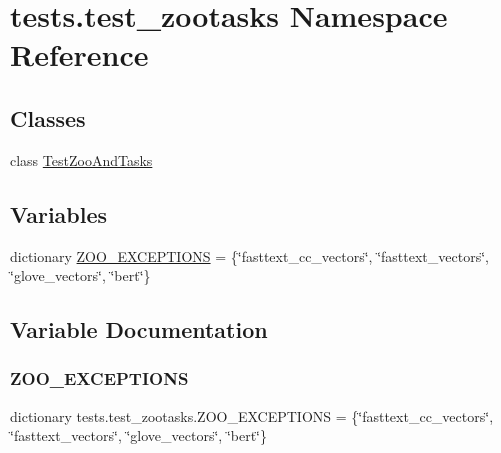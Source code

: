 \hypertarget{namespacetests_1_1test__zootasks}{}\section{tests.\+test\+\_\+zootasks Namespace Reference}
\label{namespacetests_1_1test__zootasks}
\subsection*{Classes}
\begin{DoxyCompactItemize}
\item 
class \hyperlink{classtests_1_1test__zootasks_1_1TestZooAndTasks}{Test\+Zoo\+And\+Tasks}
\end{DoxyCompactItemize}
\subsection*{Variables}
\begin{DoxyCompactItemize}
\item 
dictionary \hyperlink{namespacetests_1_1test__zootasks_a4178d1014bc80c2a09c583572fa539ed}{Z\+O\+O\+\_\+\+E\+X\+C\+E\+P\+T\+I\+O\+NS} = \{\char`\"{}fasttext\+\_\+cc\+\_\+vectors\char`\"{}, \char`\"{}fasttext\+\_\+vectors\char`\"{}, \char`\"{}glove\+\_\+vectors\char`\"{}, \char`\"{}bert\char`\"{}\}
\end{DoxyCompactItemize}


\subsection{Variable Documentation}
\mbox{\label{namespacetests_1_1test__zootasks_a4178d1014bc80c2a09c583572fa539ed}} 
\subsubsection{\texorpdfstring{Z\+O\+O\+\_\+\+E\+X\+C\+E\+P\+T\+I\+O\+NS}{ZOO\_EXCEPTIONS}}
{\footnotesize\ttfamily dictionary tests.\+test\+\_\+zootasks.\+Z\+O\+O\+\_\+\+E\+X\+C\+E\+P\+T\+I\+O\+NS = \{\char`\"{}fasttext\+\_\+cc\+\_\+vectors\char`\"{}, \char`\"{}fasttext\+\_\+vectors\char`\"{}, \char`\"{}glove\+\_\+vectors\char`\"{}, \char`\"{}bert\char`\"{}\}}

